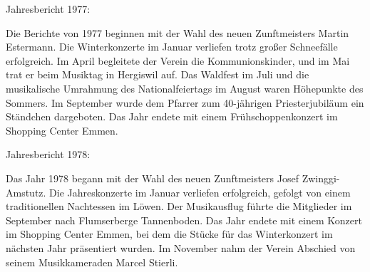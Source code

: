 Jahresbericht 1977:

Die Berichte von 1977 beginnen mit der Wahl des neuen Zunftmeisters Martin
Estermann. Die Winterkonzerte im Januar verliefen trotz großer Schneefälle
erfolgreich. Im April begleitete der Verein die Kommunionskinder, und im Mai
trat er beim Musiktag in Hergiswil auf. Das Waldfest im Juli und die
musikalische Umrahmung des Nationalfeiertags im August waren Höhepunkte des
Sommers. Im September wurde dem Pfarrer zum 40-jährigen Priesterjubiläum ein
Ständchen dargeboten. Das Jahr endete mit einem Frühschoppenkonzert im Shopping
Center Emmen.

Jahresbericht 1978:

Das Jahr 1978 begann mit der Wahl des neuen Zunftmeisters Josef Zwinggi-Amstutz.
Die Jahreskonzerte im Januar verliefen erfolgreich, gefolgt von einem
traditionellen Nachtessen im Löwen. Der Musikausflug führte die Mitglieder im
September nach Flumserberge Tannenboden. Das Jahr endete mit einem Konzert im
Shopping Center Emmen, bei dem die Stücke für das Winterkonzert im nächsten Jahr
präsentiert wurden. Im November nahm der Verein Abschied von seinem
Musikkameraden Marcel Stierli.